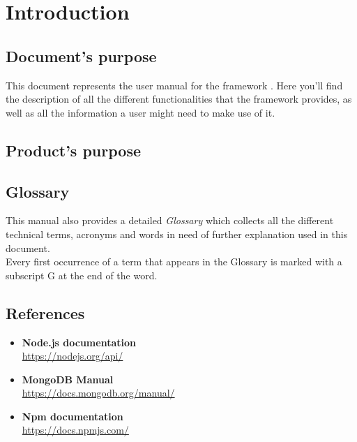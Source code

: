 \section{Introduction}

\subsection{Document's purpose}
This document represents the user manual for the framework \ProjectName{}. Here you'll find the description of all the different functionalities that the framework provides, as well as all the information a user might need to make use of it.


\subsection{Product's purpose}
\ScopoDelProdottoEng{}

\subsection{Glossary}
This manual also provides a detailed \textit{Glossary} which collects all the different technical terms, acronyms and words in need of further explanation used in this document.\\
Every first occurrence of a term that appears in the Glossary is marked with a subscript G at the end of the word.

\subsection{References}
\begin{itemize}
	\item \textbf{Node.js documentation}
	\\ \url{https://nodejs.org/api/}
	\item \textbf{MongoDB Manual}
	\\ \url{https://docs.mongodb.org/manual/}
	\item \textbf{Npm documentation}
	\\ \url{https://docs.npmjs.com/}
\end{itemize}
